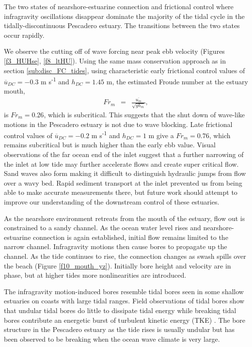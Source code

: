 The two states of nearshore-estuarine connection and frictional control
where infragravity oscillations disappear dominate the majority of
the tidal cycle in the tidally-discontinuous Pescadero estuary. The
transitions between the two states occur rapidly. 

We observe the cutting off of wave forcing near peak ebb velocity
(Figures \ref{f3_HUHse}, \ref{f8_ltHU}). Using the same mass conservation
approach as in section \ref{sub:disc_FC_tides}, using characteristic
early frictional control values of $\overline{{u}}{}_{DC}=-0.3$ m
s\textsuperscript{-1} and $h_{DC}=1.45$ m, the estimated Froude
number at the estuary mouth,
\begin{eqnarray}
Fr_{m} & = & \frac{\overline{u_{m}}}{\sqrt{gh_{m}}},\label{eq:Fr}
\end{eqnarray}
is $Fr_{m}=0.26$, which is subcritical. This suggests that the shut
down of wave-like motions in the Pescadero estuary is not due to wave
blocking. Late frictional control values of $\overline{{u}}{}_{DC}=-0.2$
m s\textsuperscript{-1} and $h_{DC}=1$ m give a $Fr_{m}=0.76$,
which remains subcritical but is much higher than the early ebb value.
Visual observations of the far ocean end of the inlet suggest that
a further narrowing of the inlet at low tide may further accelerate
flows and create super critical flow. Sand waves also form making
it difficult to distinguish hydraulic jumps from flow over a wavy
bed. Rapid sediment transport at the inlet prevented us from being
able to make accurate measurements there, but future work should attempt
to improve our understanding of the downstream control of these estuaries. 

As the nearshore environment retreats from the mouth of the estuary,
flow out is constrained to a sandy channel. As the ocean water level
rises and nearshore-estuarine connection is again established, initial
flow remains limited to the narrow channel. Infragravity motions then
cause bores to propagate up the channel. As the tide continues to
rise, the connection changes as swash spills over the beach (Figure
\ref{f10_mouth_yz}). Initially bore height and velocity are in phase,
but at higher tides more nonlinearities are introduced.

The infragravity motion-induced bores resemble tidal bores seen in
some shallow estuaries on coasts with large tidal ranges. Field observations
of tidal bores show that undular tidal bores do little to dissipate
tidal energy \citep{wolanski_undular_2004} while breaking tidal bores
contribute an energetic burst of turbulent kinetic energy (TKE) \citep{simpson_reynolds_2004}. The bore structure in the Pescadero estuary as the tide rises is usually undular but has been observed to be breaking when the ocean wave climate is very large. 


